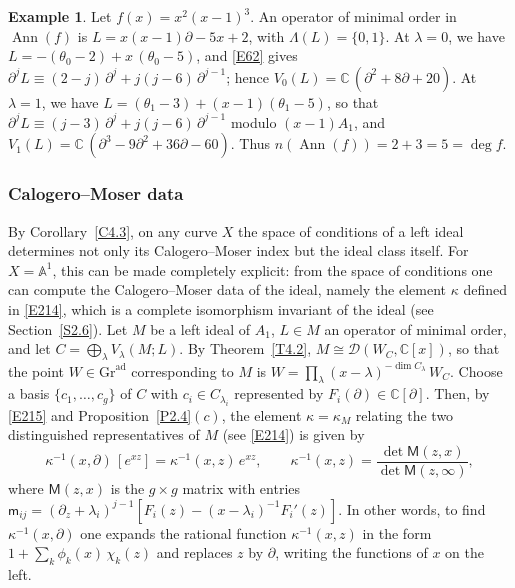 \documentclass[11pt,reqno]{amsart}
\theoremstyle{plain}
\theoremstyle{definition}
\newtheorem{example}{Example}[section]
\theoremstyle{remark}
\numberwithin{equation}{section}
\newcommand{\cD}{\mathcal{D}}
\newcommand{\C}{\mathbb{C}}
\newcommand{\A}{\mathbb{A}}
\newcommand{\del}{\partial}
\newcommand{\Gra}{\mathrm{Gr}^{\mathrm{ad}}}
\DeclareMathOperator{\Ann}{Ann}
\begin{document}
\begin{example}
\label{Ex6.2}
Let $f(x) = x^2 (x-1)^3$. An operator of minimal order in $\Ann(f)$ is $L = x(x-1)\del - 5x +
2$, with $\Lambda(L) = \{0, 1\}$. At $\lambda = 0$, we have $L = -(\theta_0 - 2) + x\,(\theta_0
- 5)$, and \eqref{E62} gives $\del^j L \equiv (2 - j)\, \del^j + j (j - 6)\, \del^{j-1}$; hence
$V_0(L) = \C\,(\del^2 + 8 \del + 20)$. At $\lambda = 1$, we have $L = (\theta_1 - 3) + (x-1)
(\theta_1 - 5)$, so that $\del^j L \equiv (j - 3)\, \del^j + j (j-6)\, \del^{j-1}$ modulo
$(x-1) A_1$, and $V_1(L) = \C\,(\del^3 - 9 \del^2 + 36 \del - 60)$. Thus $n(\Ann(f)) = 2 + 3 = 5 =
\deg f$.
\end{example}

\subsubsection{Calogero--Moser data}
By Corollary~\ref{C4.3}, on any curve $X$ the space of conditions of a left ideal determines
not only its Calogero--Moser index but the ideal class itself. For $X = \A^1$, this can be made
completely explicit: from the space of conditions one can compute the Calogero--Moser data of the
ideal, namely the element $\kappa$ defined in \eqref{E214}, which is a complete isomorphism
invariant of the ideal (see Section~\ref{S2.6}). Let $M$ be a left ideal of $A_1$, $L \in M$ an
operator of minimal order, and let $C = \bigoplus_\lambda V_\lambda(M; L)$. By
Theorem~\ref{T4.2}, $M \cong \cD(W_C, \C[x])$, so that the point $W \in \Gra$ corresponding to
$M$ is $W = \prod_\lambda (x - \lambda)^{-\dim C_\lambda}\, W_C$. Choose a basis $\{c_1, \ldots,
c_g\}$ of $C$ with $c_i \in C_{\lambda_i}$ represented by $F_i(\del) \in \C[\del]$. Then, by
\eqref{E215} and Proposition~\ref{P2.4}$(c)$, the element $\kappa = \kappa_M$ relating the two
distinguished representatives of $M$ (see \eqref{E214}) is given by
\begin{equation}
\label{E64}
  \kappa^{-1}(x, \del)\,[e^{xz}] = \kappa^{-1}(x,z)\, e^{xz} , \qquad \kappa^{-1}(x, z) =
  \frac{\det \mathsf{M}(z, x)}{\det \mathsf{M}(z, \infty)} ,
\end{equation}
where $\mathsf{M}(z,x)$ is the $g \times g$ matrix with entries $\mathsf{m}_{ij} = (\del_z +
\lambda_i)^{j-1} [F_i(z) - (x - \lambda_i)^{-1} F_i'(z)]$. In other words, to find
$\kappa^{-1}(x, \del)$ one expands the rational function $\kappa^{-1}(x,z)$ in the form
$1 + \sum_k \phi_k(x)\, \chi_k(z)$ and replaces $z$ by $\del$, writing the functions of $x$ on
the left.
\end{document}
